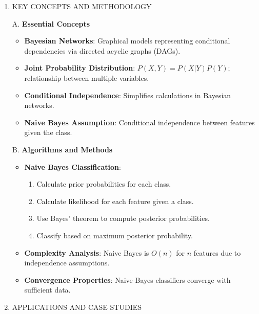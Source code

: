 \documentclass[
  12pt,
]{report}
\providecommand{\tightlist}{%
  \setlength{\itemsep}{0pt}\setlength{\parskip}{0pt}}
\begin{document}
\begin{enumerate}
\begin{itemize}
    \begin{itemize}
    \tightlist
    \item
      Assumes data is generated from a known probability distribution.
    \item
      Independence assumptions in Naive Bayes may not hold in practice.
    \end{itemize}
  \end{itemize}
\item
  KEY CONCEPTS AND METHODOLOGY

  A. \textbf{Essential Concepts}

  \begin{itemize}
  \tightlist
  \item
    \textbf{Bayesian Networks}: Graphical models representing conditional dependencies via directed acyclic graphs (DAGs).
  \item
    \textbf{Joint Probability Distribution}: \(P(X, Y) = P(X | Y) P(Y)\); relationship between multiple variables.
  \item
    \textbf{Conditional Independence}: Simplifies calculations in Bayesian networks.
  \item
    \textbf{Naive Bayes Assumption}: Conditional independence between features given the class.
  \end{itemize}

  B. \textbf{Algorithms and Methods}

  \begin{itemize}
  \tightlist
  \item
    \textbf{Naive Bayes Classification}:

    \begin{enumerate}
    \def\labelenumii{\arabic{enumii}.}
    \tightlist
    \item
      Calculate prior probabilities for each class.
    \item
      Calculate likelihood for each feature given a class.
    \item
      Use Bayes' theorem to compute posterior probabilities.
    \item
      Classify based on maximum posterior probability.
    \end{enumerate}
  \item
    \textbf{Complexity Analysis}: Naive Bayes is \(O(n)\) for \(n\) features due to independence assumptions.
  \item
    \textbf{Convergence Properties}: Naive Bayes classifiers converge with sufficient data.
  \end{itemize}
\item
  APPLICATIONS AND CASE STUDIES


\end{enumerate}
\end{document}
